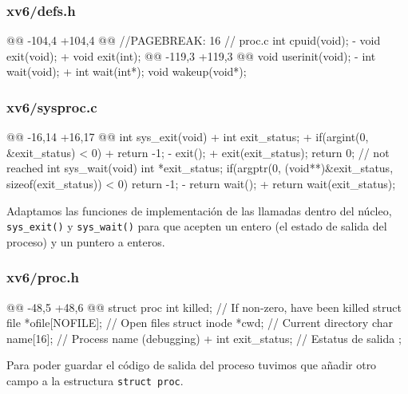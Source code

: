 \subsubsection{xv6/defs.h}
\begin{listing}
@@ -104,4 +104,4 @@
//PAGEBREAK: 16
// proc.c
    int             cpuid(void);
-   void            exit(void);
+   void            exit(int);
@@ -119,3 +119,3 @@
    void            userinit(void);
-   int             wait(void);
+   int             wait(int*);
    void            wakeup(void*);
\end{listing}

\subsubsection{xv6/sysproc.c}
\begin{listing}
@@ -16,14 +16,17 @@
    int
    sys_exit(void)
    {
+       int exit_status;
+       if(argint(0, &exit_status) < 0)
+           return -1;
-       exit();
+       exit(exit_status);
        return 0;  // not reached
    }
    int
    sys_wait(void)
    {
        int *exit_status;
        if(argptr(0, (void**)&exit_status, sizeof(exit_status)) < 0)
            return -1;
-       return wait();
+       return wait(exit_status);
    }
\end{listing}
\par Adaptamos las funciones de implementación de las llamadas dentro del núcleo, \\
\texttt{sys\_exit()} y \texttt{sys\_wait()} para que acepten un entero (el estado 
de salida del proceso) y un puntero a enteros.

\subsubsection{xv6/proc.h}
\begin{listing}
@@ -48,5 +48,6 @@ struct proc {
        int killed;                  // If non-zero, have been killed
        struct file *ofile[NOFILE];  // Open files
        struct inode *cwd;           // Current directory
        char name[16];               // Process name (debugging)
+       int exit_status;             // Estatus de salida
    };
\end{listing}
\par Para poder guardar el código de salida del proceso tuvimos que añadir otro campo a la estructura \texttt{struct proc}.

